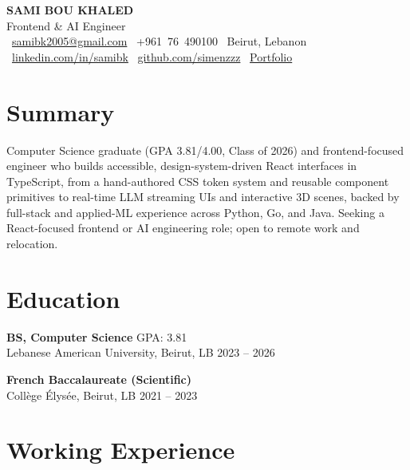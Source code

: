 \documentclass[11pt, a4paper]{article}
\begin{document}
\begin{center}
  {\LARGE\bfseries SAMI BOU KHALED} \\[4pt]
  {\large Frontend \& AI Engineer} \\[6pt]
  \faEnvelope\ \href{mailto:samibk2005@gmail.com}{samibk2005@gmail.com} \quad
  \faPhone\ +961~76~490100 \quad
  \faMapMarker*\ Beirut, Lebanon \\[2pt]
  \faLinkedin\ \href{https://www.linkedin.com/in/samibk/}{linkedin.com/in/samibk} \quad
  \faGithub\ \href{https://github.com/simenzzz}{github.com/simenzzz} \quad
  \faGlobe\ \href{https://samibk.com/}{Portfolio}
\end{center}

\section{Summary}

Computer Science graduate (GPA 3.81/4.00, Class of 2026) and frontend-focused
engineer who builds accessible, design-system-driven React interfaces in
TypeScript, from a hand-authored CSS token system and reusable component
primitives to real-time LLM streaming UIs and interactive 3D scenes, backed by
full-stack and applied-ML experience across Python, Go, and Java. Seeking a
React-focused frontend or AI engineering role; open to remote work and relocation.

\section{Education}

\textbf{BS, Computer Science} \hfill GPA: 3.81 \\
Lebanese American University, Beirut, LB \hfill 2023 -- 2026

\medskip

\textbf{French Baccalaureate (Scientific)} \\
Coll\`ege \'Elys\'ee, Beirut, LB \hfill 2021 -- 2023

\section{Working Experience}
\end{document}
